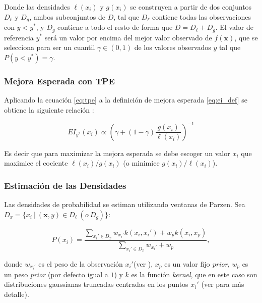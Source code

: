 Donde las densidades $\ell(x_i)$ y $g(x_i)$ se construyen a partir de dos conjuntos $D_{\ell}$ y $D_g$, ambos subconjuntos de $D$, tal que $D_{\ell}$ contiene todas las observaciones con $y < y^*$, y $D_g$ contiene a todo el resto de forma que $D = D_{\ell} + D_g$. El valor de referencia $y^{*}$ será un valor por encima del mejor valor observado de $f(\textbf{x})$, que se selecciona para ser un cuantil $\gamma \in (0,1)$ de los valores observados $y$ tal que $P(y<y^{*}) = \gamma$.


\subsubsection*{Mejora Esperada con TPE}
Aplicando la ecuación \eqref{eq:tpe} a la definición de mejora esperada \eqref{eq:ei_def} se obtiene la siguiente relación \cite{NIPS2011_86e8f7ab}:

\begin{equation}
EI_{y^*}(x_i) \propto \left( \gamma + (1-\gamma) \frac{g(x_i)}{\ell (x_i)} \right)^{-1}
\end{equation}

Es decir que para maximizar la mejora esperada se debe escoger un valor $x_i$ que maximice el cociente $\ell(x_i)/g(x_i)$ (o minimice $g(x_i)/\ell(x_i)$).

\subsubsection*{Estimación de las Densidades}

Las densidades de probabilidad se estiman utilizando ventanas de Parzen. Sea $D_x = \{x_i \ | \ (\textbf{x}, y) \in D_{\ell} \ (o\ D_g) \}$:

\begin{equation}
P(x_i) = \frac{\sum_{x_i'\in D_x}w_{x_i'}k(x_i, x_i') + w_p k(x_i, x_p) }{\sum_{x_i'\in D_x}w_{x_i'}+w_p},
\end{equation}
 

donde $w_{x_i'}$ es el peso de la observación $x_i'$(ver \cite{https://doi.org/10.48550/arxiv.1209.5111}), $x_p$ es un valor fijo \textit{prior}, $w_p$ es un peso \textit{prior} (por defecto igual a $1$) y $k$ es la función \textit{kernel}, que en este caso son distribuciones gaussianas truncadas centradas en los puntos $x_i'$ (ver \cite{10.1145/3377930.3389817} para más detalle).


